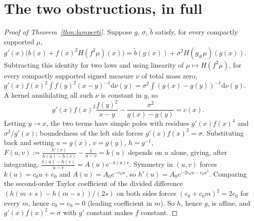\documentclass[11pt]{article}
\newcommand{\dd}{\mathrm{d}}
\theoremstyle{plain}
\theoremstyle{definition}
\theoremstyle{remark}
\begin{document}
\section{The two obstructions, in full}\label{app:obstructions}

\begin{proof}[Proof of Theorem~\ref{thm:lamperti}]
Suppose $g$, $\sigma$, $\tilde b$ satisfy, for every compactly supported $\mu$,
$g'(x)\big(b(x)+f(x)^2H(f^2\mu)(x)\big)=\tilde b(g(x))+\sigma^2H(g_\#\mu)(g(x))$.
Subtracting this identity for two laws and using linearity of $\mu\mapsto H(f^2\mu)$,
for every compactly supported signed measure $\nu$ of total mass zero,
$g'(x)f(x)^2\int f(y)^2(x-y)^{-1}\dd\nu(y) = \sigma^2\int(g(x)-g(y))^{-1}\dd\nu(y)$.
A kernel annihilating all such $\nu$ is constant in $y$, so
\begin{equation}\label{eq:kernelid-app}
  g'(x)f(x)^2\frac{f(y)^2}{x-y} - \frac{\sigma^2}{g(x)-g(y)} = c(x).
\end{equation}
Letting $y\to x$, the two terms have simple poles with residues $g'(x)f(x)^4$ and
$\sigma^2/g'(x)$; boundedness of the left side forces $g'(x)f(x)^2=\sigma$.
Substituting back and setting $u=g(x)$, $v=g(y)$, $h=g^{-1}$,
$F(u,v):=\tfrac{h'(v)}{h(u)-h(v)}-\tfrac1{u-v}=k(u)$ depends on $u$ alone, giving,
after integrating, $\tfrac{h(u)-h(v)}{u-v}=A(u)e^{-k(u)v}$. Symmetry in $(u,v)$ forces
$k(u)=c_0u+e_0$ and $A(u)=A_0e^{-e_0u}$, so $h'(u)=A_0e^{-2e_0u-c_0u^2}$. Comparing
the second-order Taylor coefficient of the divided difference
$(h(m+s)-h(m-s))/(2s)$ on both sides forces $(e_0+c_0m)^2=2c_0$ for every $m$, hence
$c_0=e_0=0$ (leading coefficient in $m$). So $h$, hence $g$, is affine, and
$g'(x)f(x)^2=\sigma$ with $g'$ constant makes $f$ constant.
\end{proof}
\end{document}
